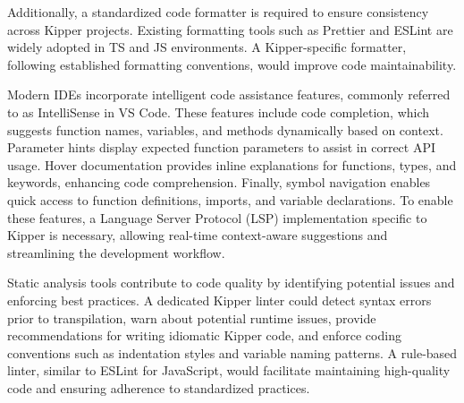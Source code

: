 Additionally, a standardized code formatter is required to ensure consistency across Kipper projects. Existing formatting tools such as Prettier and ESLint are widely adopted in TS and JS environments. A Kipper-specific formatter, following established formatting conventions, would improve code maintainability.

Modern IDEs incorporate intelligent code assistance features, commonly referred to as IntelliSense in VS Code. These features include code completion, which suggests function names, variables, and methods dynamically based on context. Parameter hints display expected function parameters to assist in correct API usage. Hover documentation provides inline explanations for functions, types, and keywords, enhancing code comprehension. Finally, symbol navigation enables quick access to function definitions, imports, and variable declarations. To enable these features, a Language Server Protocol (LSP) implementation specific to Kipper is necessary, allowing real-time context-aware suggestions and streamlining the development workflow.

Static analysis tools contribute to code quality by identifying potential issues and enforcing best practices. A dedicated Kipper linter could detect syntax errors prior to transpilation, warn about potential runtime issues, provide recommendations for writing idiomatic Kipper code, and enforce coding conventions such as indentation styles and variable naming patterns. A rule-based linter, similar to ESLint for JavaScript, would facilitate maintaining high-quality code and ensuring adherence to standardized practices.


